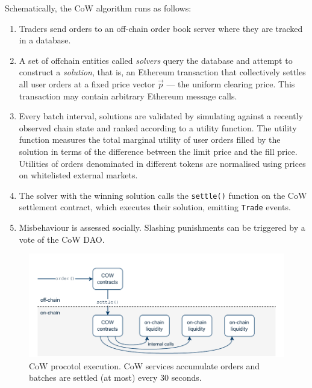 \documentclass[a4paper,10pt]{article}
\theoremstyle{remark}
\begin{document}
Schematically, the CoW algorithm runs as follows:
\begin{enumerate}
  \item 
    Traders send orders to an off-chain order book server where they are tracked in a database.
    
  \item 
    A set of offchain entities called \emph{solvers} query the database and attempt to construct a \emph{solution}, that is, an Ethereum transaction that collectively settles all user orders at a fixed price vector $\vec{p}$ --- the uniform clearing price.
    This transaction may contain arbitrary Ethereum message calls.
    
  \item
    Every batch interval, solutions are validated by simulating against a recently observed chain state and ranked according to a utility function.
    The utility function measures the total marginal utility of user orders filled by the solution in terms of the difference between the limit price and the fill price.
    Utilities of orders denominated in different tokens are normalised using prices on whitelisted external markets.
    
  \item
    The solver with the winning solution calls the \texttt{settle()} function on the CoW settlement contract, which executes their solution, emitting \texttt{Trade} events.
    
  \item
    Misbehaviour is assessed socially. Slashing punishments can be triggered by a vote of the CoW DAO.
\end{enumerate}
\begin{figure}
  \begin{center}
    \includegraphics[width=\textwidth * \real{0.8}]{diagrams/cow2.pdf}
    \caption{CoW procotol execution. CoW services accumulate orders and batches are settled (at most) every 30 seconds.}
  \end{center}
\end{figure}
\end{document}
